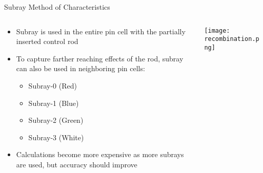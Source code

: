
\begin{frame}[t]{Subray Method of Characteristics}

\begin{columns}
    \begin{column}{0.5\textwidth}
        \begin{itemize}
            \item Subray is used in the entire pin cell with the partially inserted control rod
            \item To capture farther reaching effects of the rod, subray can also be used in neighboring pin cells:
            \begin{itemize}
                \item Subray-0 (Red)
                \item Subray-1 (Blue)
                \item Subray-2 (Green)
                \item Subray-3 (White)
            \end{itemize}
            \item Calculations become more expensive as more subrays are used, but accuracy should improve
        \end{itemize}
    \end{column}
    \begin{column}{0.5\textwidth}
        \begin{center}
            \texttt{[image: recombination.png]}
        \end{center}
    \end{column}
\end{columns}

\end{frame}